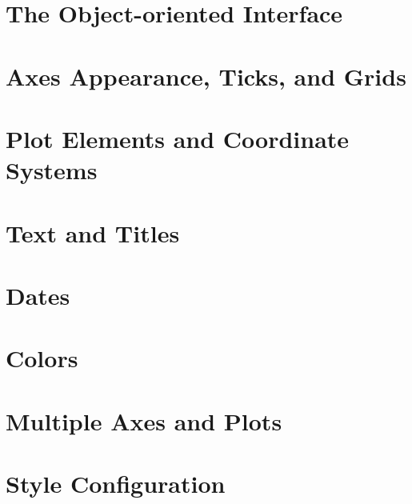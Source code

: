 \documentclass{tex/kdp} %
\begin{document}
\chapter{The Object-oriented Interface}\label{chapter:oop}


\chapter{Axes Appearance, Ticks, and Grids}\label{chapter:axes}


\chapter{Plot Elements and Coordinate Systems}\label{chapter:elements}


\chapter{Text and Titles}\label{chapter:titles}


\chapter{Dates}\label{chapter:dates}


\chapter{Colors}\label{chapter:colors}


\chapter{Multiple Axes and Plots}\label{chapter:multi}


\chapter{Style Configuration}\label{chapter:styconfig}



\end{document}
